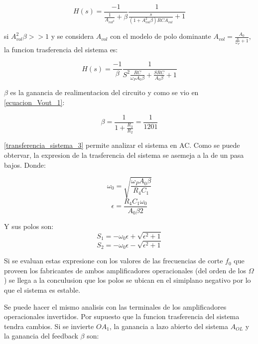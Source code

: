 \documentclass[12pt,a4paper]{article}
\begin{document}
\begin{equation} H (s) = \frac{-1}{\frac{1}{A_{vol^2}}+\beta}\frac{1}{\frac{s}{(1+A_{vol}^2\beta)RC A_{vol}}+1} \label{transferencia_sistema_2}  \end{equation}

si $A_{vol}^2 \beta >> 1 $  y se considera $A_{vol}$ con el modelo de polo dominante $A_{vol} = \frac{A_0}{\frac{S}{\omega_P}+1}$, la funcion trasferencia del sistema es:

\begin{equation} H (s) = \frac{-1}{\beta} \frac{1}{S^2\frac{RC}{\omega_P A_0 \beta} + \frac{S R C}{A_0 \beta} +1 } \label{transferencia_sistema_3}  \end{equation}

$\beta$ es la ganancia de realimentacion del circuito y como se vio en \ref{ecuacion_Vout_1}:

\begin{equation} \beta =  \frac{1}{1+ \frac{R_3}{R_2}} = \frac{1}{1201} \label{beta}  \end{equation}

\ref{transferencia_sistema_3} permite analizar el sistema en AC. Como se puede obtervar, la expresion de la trasferencia del sistema se asemeja a la de un pasa bajos. Donde:


\begin{displaymath} \omega_0 = \sqrt{\frac{\omega_P A_{0} \beta}{R_4 C_1}} \end{displaymath}
\begin{displaymath} \epsilon = \frac{R_4 C_1 \omega_0}{A_0 \beta 2} \end{displaymath}

Y sus polos son:
\begin{displaymath} S_1 = -\omega_0 \epsilon + \sqrt{\epsilon^2 + 1} \end{displaymath}
\begin{displaymath} S_2 = -\omega_0 \epsilon - \sqrt{\epsilon^2 + 1} \end{displaymath}

Si se evaluan estas expresione con los valores de las frecuencias de corte $f_0$ que proveen los fabricantes de ambos amplificadores operacionales (del orden de los $\Omega$ ) se llega a la conculusion que los polos 
se ubican en el simiplano negativo por lo que el sistema es estable. 

Se puede hacer el mismo analisis con las terminales de los amplificadores operacionales invertidos. Por supuesto que la funcion trasferencia del sistema tendra cambios. Si se invierte $OA_1$, la ganancia a lazo abierto del sistema $A_{OL}$ y la ganancia del feedback $\beta$ son:
\end{document}
